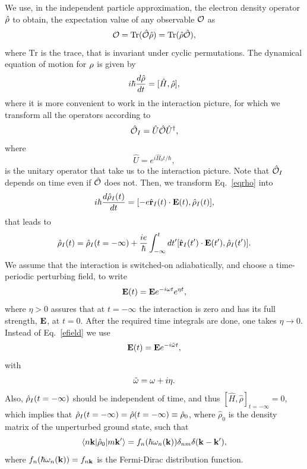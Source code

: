 \documentclass[floatfix,prb,aps,superscriptaddress,11pt,preprint]{revtex4}
\begin{document}
We use, in the independent particle approximation, the electron density
operator $\hat{{\rho}}$ to obtain, the expectation value of any observable
${\cal O}$ as
\begin{equation}\label{traza}
  {\cal O}=\mathrm{Tr}(\hat{{\cal O}}\hat\rho)=\mathrm{Tr}(\hat\rho\hat{{\cal O}}),
\end{equation}
where $\mathrm{Tr}$ is the trace, that is
invariant under cyclic permutations.
The dynamical equation of motion for ${\rho}$ is given by
\begin{equation}\label{eqrho}
i\hbar \frac{d\hat{{\rho}}}{dt}=[\hat{H},\hat{{\rho}}]
,
\end{equation}
where it is more convenient to work in the interaction picture, for
which we transform all the operators according to 
\begin{equation}\label{ip}
\hat{{\cal O}}_I=\hat{U}\hat{{\cal O}}\hat{U}^\dagger,
\end{equation}
where
\begin{equation}\label{ou}
\hat{U}=e^{i\hat{H}_0t/\hbar},
\end{equation}
is the unitary operator that take us to the interaction picture.
Note that $\hat{{\cal O}}_I$ depends on time even if $\hat{{\cal O}}$ does not.
Then, we transform Eq.~\eqref{eqrho} into
\begin{equation}\label{intrho}
i\hbar\frac{d\hat{{\rho}}_I(t)}{dt}=[-e\hat{\mathbf{r}}_I(t)\cdot\mathbf{E}(t),\hat{{\rho}}_I(t)],
\end{equation}
that leads to
\begin{equation}\label{intrho2}
\hat{{\rho}}_I(t)=\hat{{\rho}}_I(t=-\infty)
+
\frac{ie}{\hbar}\int_{-\infty}^t dt'[\hat{\mathbf{r}}_I(t')\cdot\mathbf{E}(t'),\hat{{\rho}}_I(t')].
\end{equation}
We assume that the interaction is switched-on adiabatically, and
choose a time-periodic perturbing field, to write
\begin{equation}\label{efield}
\mathbf{E}(t)=\mathbf{E} e^{-i\omega t}e^{\eta t}
,
\end{equation}
where $\eta > 0$ assures
that at $t=-\infty$ the interaction is zero and has its full strength, $\mathbf{E}$,
at $t=0$. After the required time integrals are done, one takes
$\eta\to 0$. Instead of Eq.~\eqref{efield} we use
\begin{equation}\label{efield2}
\mathbf{E}(t)=\mathbf{E} e^{-i\tilde\omega t}
,
\end{equation}
with
\begin{equation}\label{got}
\tilde\omega=\omega+i\eta
.
\end{equation}
Also, $\hat{{\rho}}_I(t=-\infty)$ should be independent of time, and thus 
$[\hat{H},\hat\rho]_{t=-\infty}=0$, which implies that 
$\hat{{\rho}}_I(t=-\infty)=\hat\rho(t=-\infty)\equiv\hat\rho_0$,
where $\hat\rho_0$ is
the density matrix of the unperturbed ground state,
such that
\begin{equation}\label{nrhon}
\langle n\mathbf{k} |\hat{{\rho}}_0| m\mathbf{k}' \rangle=f_n(\hbar\omega_n(\mathbf{k}))\delta_{nm}\delta(\mathbf{k}-\mathbf{k}')
,
\end{equation}
where $f_n(\hbar\omega_n(\mathbf{k}))=f_{n\mathbf{k}}$ is the Fermi-Dirac distribution function.
\end{document}
